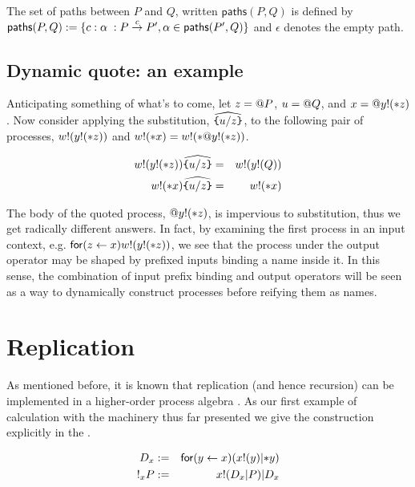 \begin{definition}
  The set of paths between $P$ and $Q$, written $\mathsf{paths}(P,Q)$ is defined by $\mathsf{paths}(P,Q) := \{ c:\alpha \; : P \stackrel{c}{\red} P', \alpha \in \mathsf{paths}(P',Q) \}$ and $\epsilon$ denotes the empty path.
\end{definition}

\subsection{ Dynamic quote: an example }

Anticipating something of what's to come, let $z = \quotep{P}$, $u = \quotep{Q}$, and $x = \quotep{\lift{y}{\dropn{z}}}$. Now consider applying the substitution,
$\widehat{\id{\{}u / z \id{\}}}$, to the following pair of processes,
$\lift{w}{y!(\dropn{z})}$ and $\lift{w}{\dropn{x}} = \lift{w}{\dropn{\quotep{\lift{y}{\dropn{z}}}}}$.

\begin{eqnarray}
	\lift{w}{\lift{y}{\dropn{z}}}\widehat{\id{\{}u / z \id{\}}}
		& = &
		\lift{w}{\lift{y}{Q}} \nonumber\\
	\lift{w}{\dropn{x}} \widehat{ \id{\{}u / z \id{\}} }
		& = &
		\lift{w}{\dropn{x}} \nonumber
\end{eqnarray}

The body of the quoted process, $\quotep{\lift{y}{\dropn{z}}}$, is
impervious to substitution, thus we get radically different
answers. In fact, by examining the first process in an input context,
e.g. $\mathsf{for}(z \leftarrow x)\lift{w}{\lift{y}{\dropn{z}}}$, we see that the process
under the output operator may be shaped by prefixed inputs binding a
name inside it. In this sense, the combination of input prefix binding
and output operators will be seen as a way to dynamically construct
processes before reifying them as names.

\section{Replication}

As mentioned before, it is known that replication (and hence
recursion) can be implemented in a higher-order process algebra
\cite{SangiorgiWalker}. As our first example of calculation with the
machinery thus far presented we give the construction explicitly in
the {\rhoc}.

\begin{eqnarray}
	D_{x} & := & \prefix{x}{y}{(\binpar{\outputp{x}{y}}{\dropn{y}})} \nonumber\\
	\bangp_{x}{P} & := & \binpar{\lift{x}{\binpar{D_{x}}{P}}}{D_{x}} \nonumber
\end{eqnarray}


